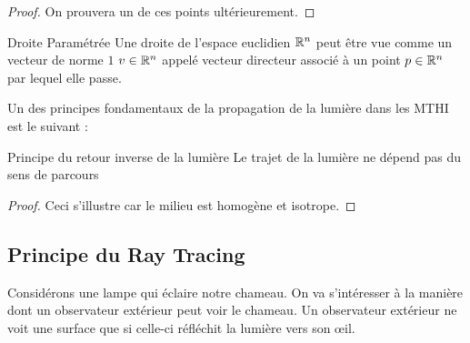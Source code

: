 \documentclass{classe}
\begin{document}
\begin{proof}
	On prouvera un de ces points ultérieurement.
\end{proof}
\begin{propositionfr}{Droite Paramétrée}{}
	Une droite de l'espace euclidien $\mathbb{R}^{n}$ peut être vue comme un vecteur de norme $1$ $v \in \mathbb{R}^{n}$ appelé vecteur directeur associé à un point $p \in \mathbb{R}^{n}$ par lequel elle passe.
\end{propositionfr}
Un des principes fondamentaux de la propagation de la lumière dans les MTHI est le suivant :
\begin{théorème}{Principe du retour inverse de la lumière}{}
Le trajet de la lumière ne dépend pas du sens de parcours
\end{théorème}
\begin{proof}
	Ceci s'illustre car le milieu est homogène et isotrope.
\end{proof}

\subsection{Principe du Ray Tracing}
Considérons une lampe qui éclaire notre chameau. On va s'intéresser à la manière dont un observateur extérieur peut voir le chameau.
Un observateur extérieur ne voit une surface que si celle-ci réfléchit la lumière vers son \oe il.
\end{document}
